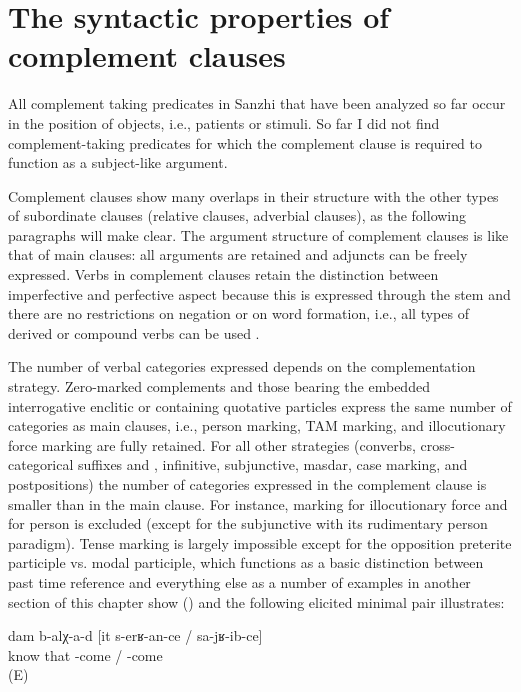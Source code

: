 
\section{The syntactic properties of complement clauses}
\label{sec:The syntactic properties of complement clauses}

All complement taking predicates in Sanzhi that have been analyzed so far occur in the position of objects, i.e., patients or stimuli. So far I did not find complement-taking predicates for which the complement clause is required to function as a subject-like argument.

Complement clauses show many overlaps in their structure with the other types of subordinate clauses (relative clauses, adverbial clauses), as the following paragraphs will make clear.
The argument structure of complement clauses is like that of main clauses: all arguments are retained and adjuncts can be freely expressed. Verbs in complement clauses retain the distinction between imperfective and perfective aspect because this is expressed through the stem and there are no restrictions on negation or on word formation, i.e., all types of derived or compound verbs can be used .

The number of verbal categories expressed depends on the complementation strategy. Zero-marked complements and those bearing the embedded interrogative enclitic or containing quotative particles express the same number of categories as main clauses, i.e., person marking, TAM marking, and illocutionary force marking are fully retained. For all other strategies (converbs, cross-categorical suffixes  and , infinitive, subjunctive, masdar, case marking, and postpositions) the number of categories expressed in the complement clause is smaller than in the main clause. For instance, marking for illocutionary force and for person is excluded (except for the subjunctive with its rudimentary person paradigm). Tense marking is largely impossible except for the opposition preterite participle vs. modal participle, which functions as a basic distinction between past time reference and everything else as a number of examples in another section of this chapter show () and the following elicited minimal pair illustrates:
%
\begin{exe}
	\ex	\label{ex:‎I know that he will come / came}
	\gll	dam	b-alχ-a-d	[it	s-erʁ-an-ce	/	sa-jʁ-ib-ce]\\
			know	that	-come	/	-come\\
	\glt	{} (E)
\end{exe}

